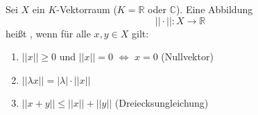 Sei $X$ ein $K$-Vektorraum ($K = \mathbb{R}$ oder $\mathbb{C}$). Eine Abbildung
$$||\cdot||: X \to \mathbb{R}$$
heißt , wenn für alle $x, y \in X$ gilt:
\begin{enumerate}[label=(N\arabic*)]
    \item $||x|| \geq 0$ und $||x|| = 0$ $\Leftrightarrow$ $x = 0$ (Nullvektor)
    \item $||\lambda x|| = |\lambda| \cdot ||x||$
    \item $||x+y|| \leq ||x|| + ||y||$ (Dreiecksungleichung)
\end{enumerate}